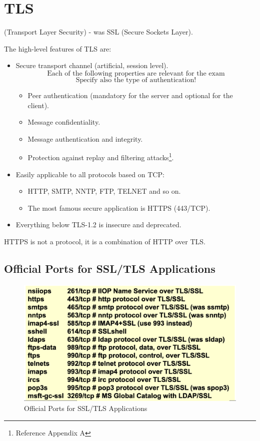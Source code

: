 \section{TLS}
\begin{center}
    (Transport Layer Security) - was SSL (Secure Sockets Layer).
\end{center}
The high-level features of TLS are:
\begin{itemize}
    \item Secure transport channel (artificial, session level).
    \[
        \text{Each of the following properties are relevant for the exam}
    \]
    \[
        \text{Specify also the type of authentication!}
    \]
    \begin{itemize}
        \item Peer authentication (mandatory for the server and optional for the client).
        \item Message confidentiality.
        \item Message authentication and integrity.
        \item Protection against replay and filtering attacks\footnote{Reference Appendix A}.
    \end{itemize}
    \item Easily applicable to all protocols based on TCP:
    \begin{itemize}
        \item HTTP, SMTP, NNTP, FTP, TELNET and so on.
        \item The most famous secure application is HTTPS (443/TCP).
    \end{itemize}
    \item Everything below TLS-1.2 is insecure and deprecated.
\end{itemize}
\begin{tcolorbox}[colback=red!10!white, colframe=red!70!black, coltitle=white, title=Beware]
HTTPS is not a protocol, it is a combination of HTTP over TLS.
\end{tcolorbox}

\subsection*{Official Ports for SSL/TLS Applications}
\begin{figure}[H]
    \centering
    \includegraphics[width=0.5\linewidth]{Images/Appsec/ssl-tls_prot.png}
    \caption{Official Ports for SSL/TLS Applications}
\end{figure}

